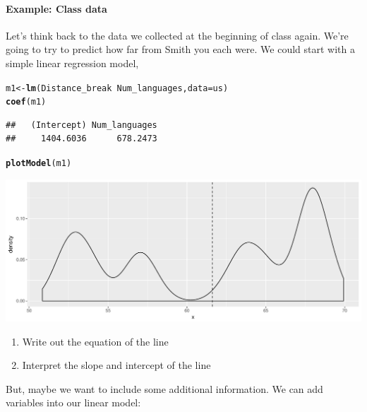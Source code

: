 \documentclass[10pt]{article}\usepackage[]{graphicx}\usepackage[]{color}
\makeatletter
\def\maxwidth{ %
  \ifdim\Gin@nat@width>\linewidth
    \linewidth
  \else
    \Gin@nat@width
  \fi
}
\newcommand{\hlopt}[1]{\textcolor[rgb]{0,0,0}{#1}}%
\newcommand{\hlstd}[1]{\textcolor[rgb]{0.345,0.345,0.345}{#1}}%
\newcommand{\hlkwb}[1]{\textcolor[rgb]{0.69,0.353,0.396}{#1}}%
\newcommand{\hlkwc}[1]{\textcolor[rgb]{0.333,0.667,0.333}{#1}}%
\newcommand{\hlkwd}[1]{\textcolor[rgb]{0.737,0.353,0.396}{\textbf{#1}}}%
\newenvironment{kframe}{%
 \def\at@end@of@kframe{}%
 \ifinner\ifhmode%
  \def\at@end@of@kframe{\end{minipage}}%
  \begin{minipage}{\columnwidth}%
 \fi\fi%
 \def\FrameCommand##1{\hskip\@totalleftmargin \hskip-\fboxsep
 \colorbox{shadecolor}{##1}\hskip-\fboxsep
     \hskip-\linewidth \hskip-\@totalleftmargin \hskip\columnwidth}%
 \MakeFramed {\advance\hsize-\width
   \@totalleftmargin\z@ \linewidth\hsize
   \@setminipage}}%
 {\par\unskip\endMakeFramed%
 \at@end@of@kframe}
\newenvironment{knitrout}{}{} %
\makeatother
\begin{document}
\clearpage
\paragraph{Example: Class data}

Let's think back to the data we collected at the beginning of class again. We're going to try to predict how far from Smith you each were. We could start with a simple linear regression model,



\begin{knitrout}\footnotesize
{}\color{fgcolor}\begin{kframe}
\begin{alltt}
\hlstd{m1} \hlkwb{<-} \hlkwd{lm}\hlstd{(Distance_break}\hlopt{~}\hlstd{Num_languages,} \hlkwc{data}\hlstd{=us)}
\hlkwd{coef}\hlstd{(m1)}
\end{alltt}
\begin{verbatim}
##   (Intercept) Num_languages 
##     1404.6036      678.2473
\end{verbatim}
\begin{alltt}
\hlkwd{plotModel}\hlstd{(m1)}
\end{alltt}
\end{kframe}
\includegraphics[width=\maxwidth]{figure/unnamed-chunk-2-1} 

\end{knitrout}

\begin{enumerate}
\itemsep1.2in
\item Write out the equation of the line
\item Interpret the slope and intercept of the line
\end{enumerate}

\clearpage
But, maybe we want to include some additional information. We can add variables into our linear model:
\end{document}
